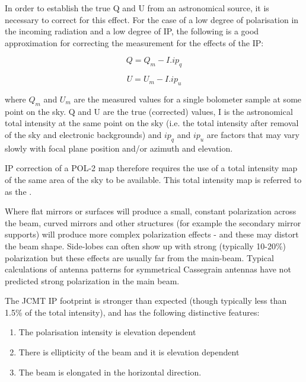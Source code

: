 In order to establish the true Q and U from an astronomical source, it is necessary to correct
for this effect. For the case of a low degree of polarisation in the incoming radiation and a low
degree of IP, the following is a good approximation for correcting the measurement for the effects of the IP:

\begin{equation}
Q = Q_{m} - I. ip_{q}
\end{equation}

\begin{equation}
U = U_{m} - I. ip_{u}
\end{equation}

where $Q_{m}$ and $U_{m}$ are the measured values for a single bolometer sample at
some point on the sky. Q and U are the true (corrected) values, I is the astronomical
total intensity at the same point on the sky (i.e. the total intensity after removal of
the sky and electronic backgrounds) and $ip_{q}$  and $ip_{u}$  are factors that may vary
slowly with focal plane position and/or azimuth and elevation.

IP correction of a POL-2 map therefore requires the use of a total intensity map of the same area
of the sky to be available. This total intensity map is referred to as the .

Where flat mirrors or surfaces will produce a small, constant polarization across the beam,
curved mirrors and other structures (for example the secondary mirror supports) will
produce more complex polarization effects - and these may distort the beam shape.
Side-lobes can often show up with strong (typically 10-20\%) polarization but these
effects are usually far from the main-beam. Typical calculations of antenna patterns
for symmetrical Cassegrain antennas have not predicted strong polarization in the main beam.

The JCMT IP footprint is stronger than expected (though typically less than 1.5\% of
the total intensity), and has the following distinctive features:

\begin{enumerate}\itemsep-0.2em
\item The polarisation intensity is elevation dependent
\item There is ellipticity of the beam and it is elevation dependent
\item The beam is elongated in the horizontal direction.
\end{enumerate}

